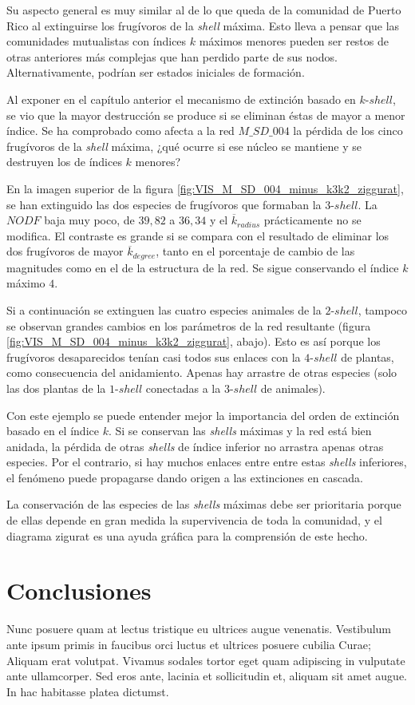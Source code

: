 Su aspecto general es muy similar al de lo que queda de la comunidad de Puerto Rico al extinguirse los frugívoros de la \textit{shell} máxima. Esto lleva a pensar que las comunidades mutualistas con índices $k$ máximos menores pueden ser restos de otras anteriores más complejas que han perdido parte de sus nodos. Alternativamente, podrían ser estados iniciales de formación.

Al exponer en el capítulo anterior el mecanismo de extinción basado en $k$-$shell$, se vio que la mayor destrucción se produce si se eliminan éstas de mayor a menor índice. Se ha comprobado como afecta a la red $M\_SD\_004$ la pérdida de los cinco frugívoros de la \textit{shell} máxima, ¿qué ocurre si ese núcleo se mantiene y se destruyen los de índices $k$ menores?

En la imagen superior de la figura \ref{fig:VIS_M_SD_004_minus_k3k2_ziggurat}, se han extinguido las dos especies de frugívoros que formaban la $3$-$shell$. La $NODF$ baja muy poco, de $39,82$ a $36,34$ y el $\overline k_{radius}$ prácticamente no se modifica. El contraste es grande si se compara con el resultado de eliminar los dos frugívoros de mayor $\overline k_{degree}$, tanto en el porcentaje de cambio de las magnitudes como en el de la estructura de la red. Se sigue conservando el índice $k$ máximo $4$.

Si a continuación se extinguen las cuatro especies animales de la $2$-$shell$, tampoco se observan grandes cambios en los parámetros de la red resultante (figura \ref{fig:VIS_M_SD_004_minus_k3k2_ziggurat}, abajo). Esto es así porque los frugívoros desaparecidos tenían casi todos sus enlaces con la $4$-$shell$ de plantas, como consecuencia del anidamiento. Apenas hay arrastre de otras especies (solo las dos plantas de la $1$-$shell$ conectadas a la $3$-$shell$ de animales).

Con este ejemplo se puede entender mejor la importancia del orden de extinción basado en el índice $k$. Si se conservan las \textit{shells} máximas y la red está bien anidada, la pérdida de otras \textit{shells} de índice inferior no arrastra apenas otras especies. Por el contrario, si hay muchos enlaces entre entre estas \textit{shells} inferiores, el fenómeno puede propagarse dando origen a las extinciones en cascada.

La conservación de las especies de las \textit{shells} máximas debe ser prioritaria porque de ellas depende en gran medida la supervivencia de toda la comunidad, y el diagrama zigurat es una ayuda gráfica para la comprensión de este hecho.

\clearpage
\section{Conclusiones}

Nunc posuere quam at lectus tristique eu ultrices augue venenatis. Vestibulum ante ipsum primis in faucibus orci luctus et ultrices posuere cubilia Curae; Aliquam erat volutpat. Vivamus sodales tortor eget quam adipiscing in vulputate ante ullamcorper. Sed eros ante, lacinia et sollicitudin et, aliquam sit amet augue. In hac habitasse platea dictumst.
